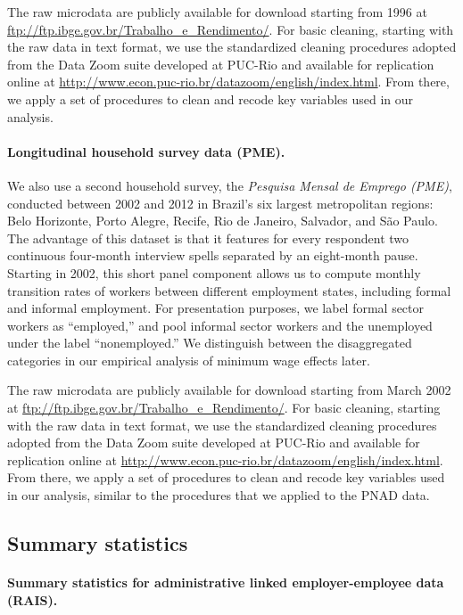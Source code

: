 The raw microdata are publicly available for download starting from
1996 at \url{ftp://ftp.ibge.gov.br/Trabalho_e_Rendimento/}. For basic
cleaning, starting with the raw data in text format, we use the standardized
cleaning procedures adopted from the Data Zoom suite developed at
PUC-Rio and available for replication online at \url{http://www.econ.puc-rio.br/datazoom/english/index.html}.
From there, we apply a set of procedures to clean and recode key variables
used in our analysis.


\paragraph{Longitudinal household survey data (PME).}

We also use a second household survey, the \emph{Pesquisa Mensal de
Emprego (PME)}, conducted between 2002 and 2012 in Brazil's six largest metropolitan regions: Belo Horizonte, Porto Alegre, Recife, Rio de Janeiro, Salvador, and S{\~{a}}o Paulo.
The advantage of this dataset is that it features for every respondent
two continuous four-month interview spells separated by an eight-month pause.
Starting in 2002, this short panel component allows us to compute monthly
transition rates of workers between different employment states, including formal and informal employment. For presentation
purposes, we label formal sector workers as ``employed,'' and pool
informal sector workers and the unemployed under the label ``nonemployed.''
We distinguish between the disaggregated categories in our empirical
analysis of minimum wage effects later.

The raw microdata are publicly available for download starting from
March 2002 at \url{ftp://ftp.ibge.gov.br/Trabalho_e_Rendimento/}.
For basic cleaning, starting with the raw data in text format, we
use the standardized cleaning procedures adopted from the Data Zoom
suite developed at PUC-Rio and available for replication online at
\url{http://www.econ.puc-rio.br/datazoom/english/index.html}. From
there, we apply a set of procedures to clean and recode key variables
used in our analysis, similar to the procedures that we applied to
the PNAD data.




\clearpage
\subsection{Summary statistics\label{subsec:Summary-statistics}}

\paragraph{Summary statistics for administrative linked employer-employee data (RAIS).}

